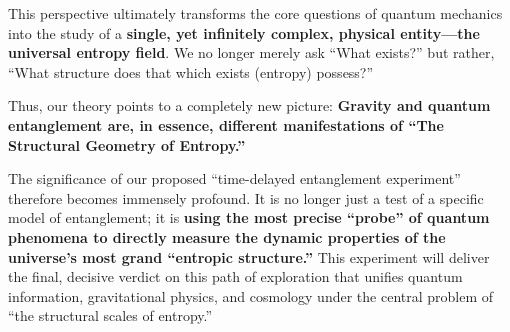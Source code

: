 \documentclass[11pt]{article}
\begin{document}
\noindent This perspective ultimately transforms the core questions of quantum mechanics into the study of a \textbf{single, yet infinitely complex, physical entity—the universal entropy field}. We no longer merely ask ``What exists?'' but rather, ``What structure does that which exists (entropy) possess?''

\noindent Thus, our theory points to a completely new picture: \textbf{Gravity and quantum entanglement are, in essence, different manifestations of ``The Structural Geometry of Entropy.''}

\noindent The significance of our proposed ``time-delayed entanglement experiment'' therefore becomes immensely profound. It is no longer just a test of a specific model of entanglement; it is \textbf{using the most precise ``probe'' of quantum phenomena to directly measure the dynamic properties of the universe's most grand ``entropic structure.''} This experiment will deliver the final, decisive verdict on this path of exploration that unifies quantum information, gravitational physics, and cosmology under the central problem of ``the structural scales of entropy.''
\end{document}
